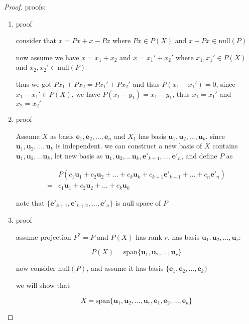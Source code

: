 \begin{proof}
    proofs:

    \begin{enumerate}
        \item proof

    consider that  $x =Px +  x - Px$ where  $Px \in P(X)$ and $x - Px \in \mathrm{null}(P)$ 

    now assume we have $x = x_1 + x_2$ and $x = x_1' + x_2'$ where $x_1,x_1' \in P(X)$ and $x_2, x_2' \in \mathrm{null}(P)$

    thus we got $Px_1 + Px_2 = Px_1' + Px_2'$ and thus $P(x_1 -x_1') = 0$, since $x_1 - x_1' \in P(X)$, we have $P(x_1 - y_1) = x_1 -y_1$, 
    thus $x_1 = x_1'$ and $x_2 = x_2'$

        \item proof

    Assume $X$ as basis $\mathbf{e}_1,\mathbf{e}_2,...,\mathbf{e}_n$ and $X_1$ 
    has basis $\mathbf{u}_1,\mathbf{u}_2,...,\mathbf{u}_k$. since $\mathbf{u}_1,\mathbf{u}_2,..., \mathbf{u}_k$
    is independent. we can construct a new basis of $X$ contains $\mathbf{u}_1,\mathbf{u}_2,...\mathbf{u}_k$, let new 
    basis as $\mathbf{u}_1,\mathbf{u}_2,...\mathbf{u}_k, \mathbf{e}'_{k+1}, ... ,\mathbf{e}'_{n}$, and define $P$
    as

    \begin{align*}
        &P(c_1 \mathbf{u}_1 + c_2 \mathbf{u}_2 + ... + c_k \mathbf{u}_k + c_{k+1}\mathbf{e}'_{k+1} + ... + c_n\mathbf{e}'_{n} ) \\
        =& c_1 \mathbf{u}_1 + c_2 \mathbf{u}_2 + ... + c_k \mathbf{u}_k
    \end{align*}

    note that $\{\mathbf{e}'_{k+1}, \mathbf{e}'_{k+2}, ... ,\mathbf{e}'_{n}\}$ is null space of $P$

        \item proof

        assume projection $P^2 = P$ and $P(X)$ has rank $r$, has basis $\mathbf{u}_1,\mathbf{u}_2,...,\mathbf{u}_r$:

        \[
            P(X) = \mathrm{span}\{ \mathbf{u}_1, \mathbf{u}_2,..., \mathbf{u}_r \}
        \]

        now consider $\mathrm{null}(P)$, and assume it has basis $\{ \mathbf{e}_1, \mathbf{e}_2, ..., \mathbf{e}_k \}$

        we will show that

        \[
            X = \mathrm{span} \{\mathbf{u}_1, \mathbf{u}_2,..., \mathbf{u}_r, \mathbf{e}_1, \mathbf{e}_2, ..., \mathbf{e}_k \}
        \]


\end{enumerate}
\end{proof}
